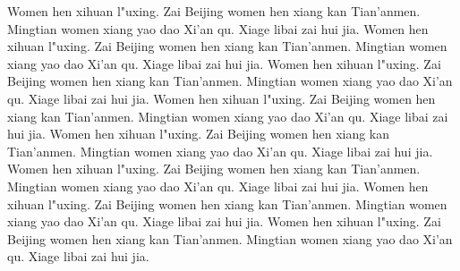 \documentclass[12pt,b5paper]{article}
\begin{document}


Women hen xihuan l"uxing.  Zai Beijing women hen xiang kan Tian'anmen.
Mingtian women xiang yao dao Xi'an qu.  Xiage libai zai hui jia.
Women hen xihuan l"uxing.  Zai Beijing women hen xiang kan Tian'anmen.
Mingtian women xiang yao dao Xi'an qu.  Xiage libai zai hui jia.
Women hen xihuan l"uxing.  Zai Beijing women hen xiang kan Tian'anmen.
Mingtian women xiang yao dao Xi'an qu.  Xiage libai zai hui jia.
Women hen xihuan l"uxing.  Zai Beijing women hen xiang kan Tian'anmen.
Mingtian women xiang yao dao Xi'an qu.  Xiage libai zai hui jia.
Women hen xihuan l"uxing.  Zai Beijing women hen xiang kan Tian'anmen.
Mingtian women xiang yao dao Xi'an qu.  Xiage libai zai hui jia.
Women hen xihuan l"uxing.  Zai Beijing women hen xiang kan Tian'anmen.
Mingtian women xiang yao dao Xi'an qu.  Xiage libai zai hui jia.
Women hen xihuan l"uxing.  Zai Beijing women hen xiang kan Tian'anmen.
Mingtian women xiang yao dao Xi'an qu.  Xiage libai zai hui jia.
Women hen xihuan l"uxing.  Zai Beijing women hen xiang kan Tian'anmen.
Mingtian women xiang yao dao Xi'an qu.  Xiage libai zai hui jia.
\end{document}
